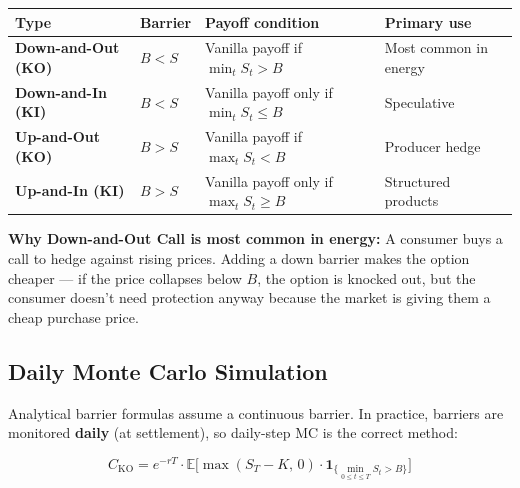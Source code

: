 \documentclass[11pt,a4paper]{article}
\renewcommand{\arraystretch}{1}
\renewcommand{\arraystretch}{1}
\renewcommand{\arraystretch}{1.45}
\begin{document}
\begin{center}
\renewcommand{\arraystretch}{1.6}
\begin{tabularx}{\textwidth}{>{\bfseries}l l X l}
\toprule
Type & Barrier & Payoff condition & Primary use \\
\midrule
Down-and-Out (KO) & $B<S$ & Vanilla payoff if $\min_t S_t > B$ & Most common in energy \\
Down-and-In  (KI) & $B<S$ & Vanilla payoff only if $\min_t S_t \leq B$ & Speculative \\
Up-and-Out   (KO) & $B>S$ & Vanilla payoff if $\max_t S_t < B$ & Producer hedge \\
Up-and-In    (KI) & $B>S$ & Vanilla payoff only if $\max_t S_t \geq B$ & Structured products \\
\bottomrule
\end{tabularx}
\end{center}

\textbf{Why Down-and-Out Call is most common in energy:}
A consumer buys a call to hedge against rising prices. Adding a down barrier
makes the option cheaper --- if the price collapses below $B$, the option is
knocked out, but the consumer doesn't need protection anyway because the
market is giving them a cheap purchase price.

\subsection{Daily Monte Carlo Simulation}

Analytical barrier formulas assume a continuous barrier. In practice, barriers
are monitored \textbf{daily} (at settlement), so daily-step MC is the correct method:

\begin{equation}
C_\text{KO}=e^{-rT}\cdot\mathbb{E}\Big[
\max(S_T-K,\,0)\cdot\mathbf{1}_{\{\min_{0\leq t\leq T}S_t>B\}}\Big]
\end{equation}
\end{document}
